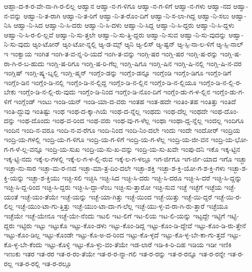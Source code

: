 {ಆಹ್ಲಾ-ದ-ಕ-ರ-ವೇ-ನಾ-ಗಿ-ರ-ಲಿಲ್ಲ
ಆಹ್ವಾನ
ಆಹ್ವಾ-ನ-ಗ-ಳಿಗೂ
ಆಹ್ವಾ-ನ-ಗ-ಳಿಗೆ
ಆಹ್ವಾ-ನ-ಗಳು
ಆಹ್ವಾ-ನದ
ಆಹ್ವಾ-ನ-ವನ್ನು
ಆಹ್ವಾ-ನಿ-ತ-ರಾಗಿ
ಆಹ್ವಾ-ನಿ-ತ-ರಿಗೆ
ಆಹ್ವಾ-ನಿ-ತ-ರೊಂ-ದಿಗೆ
ಆಹ್ವಾ-ನಿ-ಸ-ಲಾ-ಗಿದ್ದ
ಆಹ್ವಾ-ನಿ-ಸಲು
ಆಹ್ವಾ-ನಿಸಿ
ಆಹ್ವಾ-ನಿ-ಸಿದ
ಆಹ್ವಾ-ನಿ-ಸಿ-ದರು
ಆಹ್ವಾ-ನಿ-ಸಿ-ದಳು
ಆಹ್ವಾ-ನಿ-ಸಿದ್ದ
ಆಹ್ವಾ-ನಿ-ಸಿ-ದ್ದರು
ಆಹ್ವಾ-ನಿ-ಸಿ-ದ್ದಳು
ಆಹ್ವಾ-ನಿ-ಸಿ-ರ-ಲಿ-ಲ್ಲವೆ
ಆಹ್ವಾ-ನಿ-ಸು-ತ್ತಲೇ
ಆಹ್ವಾ-ನಿ-ಸು-ತ್ತಿ-ದ್ದರು
ಆಹ್ವಾ-ನಿ-ಸುವ
ಆಹ್ವಾ-ನಿ-ಸು-ವುದನ್ನು
ಆಹ್ವಾ-ನಿ-ಸು-ವುದು
ಆ್ಯಂ-ಟೋನ್
ಆ್ಯಂ-ಟೋ-ನ್ನಲ್ಲಿ
ಆ್ಯ-ಡ-ಮ್ಸ್
ಆ್ಯನಿ
ಆ್ಯ-ಲಿಸ್
ಆ್ಯ-ಷ್ಟನ್
ಆ್ಯ-ಸ್ಪಿ-ನಾ-ಲ-ಳಿಗೆ
ಆ್ಯ-ಸ್ಪಿ-ನಾಲ್
ಇ
ಇಂಕ್ವಾಯ
ಇಂಗಿತ
ಇಂಗಿ-ತ-ವ-ನ್ನ-ರಿ-ಯದೆ
ಇಂಗಿ-ತ-ವನ್ನು
ಇಂಗ್ಗಿ-ಷರ
ಇಂಗ್ಲಿ-ಷರ
ಇಂಗ್ಲಿ-ಷ-ರನ್ನು
ಇಂಗ್ಲಿ-ಷ-ರಾ-ಗಿ-ರ-ಬ-ಹುದು
ಇಂಗ್ಲಿ-ಷ-ರಿಗೂ
ಇಂಗ್ಲಿ-ಷ-ರಿ-ಗೆಲ್ಲ
ಇಂಗ್ಲಿ-ಷಿಗೂ
ಇಂಗ್ಲಿ-ಷಿನ
ಇಂಗ್ಲಿ-ಷಿ-ನಲ್ಲಿ
ಇಂಗ್ಲಿ-ಷಿ-ನ-ವರ
ಇಂಗ್ಲಿಷ್
ಇಂಗ್ಲಿ-ಷ್ಕ್ಲ-ಬ್ನಲ್ಲಿ
ಇಂಗ್ಲಿ-ಷ್ಮನ್
ಇಂಗ್ಲೆಂ-ಡನ್ನು
ಇಂಗ್ಲೆಂ-ಡನ್ನೂ
ಇಂಗ್ಲೆಂಡಿ
ಇಂಗ್ಲೆಂ-ಡಿಗೂ
ಇಂಗ್ಲೆಂ-ಡಿಗೆ
ಇಂಗ್ಲೆಂ-ಡಿನ
ಇಂಗ್ಲೆಂ-ಡಿ-ನಲ್ಲಿ
ಇಂಗ್ಲೆಂ-ಡಿ-ನ-ಲ್ಲಿದ್ದ
ಇಂಗ್ಲೆಂ-ಡಿ-ನ-ಲ್ಲಿನ
ಇಂಗ್ಲೆಂ-ಡಿ-ನ-ಲ್ಲಿಯೂ
ಇಂಗ್ಲೆಂ-ಡಿ-ನ-ಲ್ಲಿ-ರ-ಬೇಕು
ಇಂಗ್ಲೆಂ-ಡಿ-ನ-ಲ್ಲಿ-ರು-ವುದು
ಇಂಗ್ಲೆಂ-ಡಿ-ನಿಂದ
ಇಂಗ್ಲೆಂ-ಡಿ-ನೊಂ-ದಿಗೆ
ಇಂಗ್ಲೆಂ-ಡು-ಗ-ಳ-ಲ್ಲಿನ
ಇಂಗ್ಲೆಂ-ಡು-ಗ-ಳಿಗೆ
ಇಂಗ್ಲೆಂಡ್
ಇಂಟು
ಇಂಡಿ-ಯನ್
ಇಂಡಿ-ಯಾ-ದ-ವರು
ಇಂತಹ
ಇಂತ-ಹದೇ
ಇಂತಿಂ-ತಹ
ಇಂತಿತ್ತು
ಇಂತಿದೆ
ಇಂತಿ-ದ್ದುವು
ಇಂತಿಷ್ಟು
ಇಂಥ
ಇಂಥ-ದ-ಕ್ಕಾ-ಗಿಯೆ
ಇಂಥ-ದ-ನ್ನೆಲ್ಲ
ಇಂಥದು
ಇಂಥ-ದೆಲ್ಲ
ಇಂಥದೇ
ಇಂಥ-ದೊಂ-ದನ್ನು
ಇಂಥ-ದೊಂದು
ಇಂಥ-ವ-ರಿಂದ
ಇಂಥ-ವರು
ಇಂಥ-ವು-ಗ-ಳೆಲ್ಲ
ಇಂಥಾ
ಇಂಥಾ-ದ್ದ-ನ್ನೆಲ್ಲ
ಇಂದಲ್ಲ
ಇಂದಿಗೂ
ಇಂದಿನ
ಇಂದಿ-ನ-ವರೂ
ಇಂದಿ-ನ-ವ-ರೆಗೂ
ಇಂದಿ-ನಿಂದ
ಇಂದಿ-ನಿಂ-ದಲೇ
ಇಂದು
ಇಂದೇ
ಇಂದೋರ್
ಇಂದ್ರಿಯ
ಇಂದ್ರಿ-ಯ-ಗಳಲ್ಲಿ
ಇಂದ್ರಿ-ಯ-ಗ-ಳಿಗೂ
ಇಂದ್ರಿ-ಯ-ಗ-ಳಿಗೆ
ಇಂದ್ರಿ-ಯ-ಗ-ಳೆಲ್ಲ
ಇಂದ್ರಿ-ಯ-ಜೀ-ವನ
ಇಂದ್ರಿ-ಯ-ಭೋ-ಗ-ಗ-ಳೆ-ಲ್ಲ-ವನ್ನೂ
ಇಂದ್ರಿ-ಯ-ಸುಖ
ಇಂದ್ರಿ-ಯ-ಸು-ಖ-ವನ್ನು
ಇಂದ್ರಿ-ಯ-ಸು-ಖವೇ
ಇಂಪು-ದನಿ
ಇಕೊ
ಇಕ್ಕ-ಟ್ಟಿನ
ಇಕ್ಕ-ಟ್ಟಿ-ನದು
ಇಕ್ಕೆ-ಲ-ಗಳಲ್ಲಿ
ಇಕ್ಕೆ-ಲ-ಗ-ಳ-ಲ್ಲಿ-ರುವ
ಇಕ್ಕೆ-ಲ-ಗ-ಳಲ್ಲೂ
ಇಗ-ರ್ಜಿಗೂ
ಇಗ-ರ್ಜಿ-ಯಾದ
ಇಗೊ
ಇಚ್ಛಾ
ಇಚ್ಛಾ-ನು-ಸಾರ
ಇಚ್ಛಾ-ಮ-ರ-ಣದ
ಇಚ್ಛಾ-ಮಾ-ತ್ರ-ದಿಂ-ದಲೇ
ಇಚ್ಛಾ-ಶಕ್ತಿ
ಇಚ್ಛಾ-ಶ-ಕ್ತಿ-ಯೋ-ಗ-ಶ-ಕ್ತಿ-ಗಳು
ಇಚ್ಛಾ-ಶ-ಕ್ತಿ-ಯನ್ನು
ಇಚ್ಛಾ-ಶ-ಕ್ತಿಯು
ಇಚ್ಛಿ-ಸಲಿ
ಇಚ್ಛಿಸಿ
ಇಚ್ಛಿ-ಸಿದ
ಇಚ್ಛಿ-ಸಿ-ದರು
ಇಚ್ಛಿ-ಸಿ-ದರೂ
ಇಚ್ಛಿ-ಸಿ-ದರೆ
ಇಚ್ಛಿ-ಸಿ-ದ್ದನ್ನು
ಇಚ್ಛಿ-ಸಿ-ದ್ದ-ರಿಂದ
ಇಚ್ಛಿ-ಸಿ-ದ್ದರು
ಇಚ್ಛಿ-ಸಿ-ದ್ದಾ-ಳೆಂಬ
ಇಚ್ಛಿ-ಸು-ತ್ತಾರೋ
ಇಚ್ಛಿ-ಸುವ
ಇಚ್ಛೆ
ಇಚ್ಛೆಗೆ
ಇಚ್ಛೆಯ
ಇಚ್ಛೆ-ಯಂತೆ
ಇಚ್ಛೆ-ಯಂ-ತೆಯೇ
ಇಚ್ಛೆ-ಯನ್ನು
ಇಚ್ಛೆ-ಯಾ-ಗಿತ್ತು
ಇಚ್ಛೆ-ಯಿಂದ
ಇಚ್ಛೆ-ಯಿತ್ತು
ಇಚ್ಛೆ-ಯಿ-ದ್ದರೆ
ಇಚ್ಛೆ-ಯಿ-ರ-ಲಿಲ್ಲ
ಇಚ್ಛೆ-ಯುಂ-ಟಾ-ಗು-ತ್ತಿತ್ತು
ಇಚ್ಛೆ-ಯುಂ-ಟಾ-ದಾ-ಗ-ಲೆಲ್ಲ
ಇಚ್ಛೆ-ಯು-ಳ್ಳ-ವ-ರಾ-ಗಿ-ರು-ತ್ತಾರೆ
ಇಚ್ಛೆಯೂ
ಇಚ್ಛೆಯೇ
ಇಚ್ಛೆ-ಯೇನೂ
ಇಚ್ಛೆ-ಯೇ-ನೆಂದು
ಇಟಲಿ
ಇಟ-ಲಿಗೆ
ಇಟ-ಲಿಯ
ಇಟ-ಲಿ-ಯನ್ನು
ಇಟ್ಟದ್ದೇ
ಇಟ್ಟಿಗೆ
ಇಟ್ಟಿ-ದ್ದರು
ಇಟ್ಟಿರು
ಇಟ್ಟು
ಇಟ್ಟುಕೊ
ಇಟ್ಟು-ಕೊಂ-ಡಳು
ಇಟ್ಟು-ಕೊಂ-ಡಿದ್ದ
ಇಟ್ಟು-ಕೊಂ-ಡಿ-ದ್ದೇವೆ
ಇಟ್ಟು-ಕೊಂ-ಡಿ-ರು-ತ್ತೇನೆ
ಇಟ್ಟು-ಕೊಂ-ಡಿಲ್ಲ
ಇಟ್ಟು-ಕೊಂಡೇ
ಇಟ್ಟು-ಕೊ-ಅ-ದ-ರಿಂದ
ಇಟ್ಟು-ಕೊ-ಳ್ಳದೆ
ಇಟ್ಟು-ಕೊ-ಳ್ಳ-ಬೇ-ಕಾ-ಗು-ತ್ತದೆ
ಇಟ್ಟು-ಕೊ-ಳ್ಳ-ಬೇ-ಕೆಂದು
ಇಟ್ಟು-ಕೊಳ್ಳಿ
ಇಟ್ಟು-ಕೊ-ಳ್ಳು-ವಂ-ತೆಯೇ
ಇಡ-ಲಾರೆ
ಇಡಿ-ಕಿ-ರಿ-ದಿಹ
ಇಡಿಯ
ಇಡೀ
ಇಣಿಕಿ
ಇಣುಕು
ಇತರ
ಇತ-ರರ
ಇತ-ರ-ರಂ-ತೆಯೇ
ಇತ-ರ-ರ-ನ್ನಾ-ಗಲಿ
ಇತ-ರ-ರನ್ನು
ಇತ-ರ-ರನ್ನೂ
ಇತ-ರ-ರನ್ನೇ
ಇತ-ರ-ರಲ್ಲ
ಇತ-ರ-ರಲ್ಲಿ
ಇತ-ರ-ರಲ್ಲೂ
}
